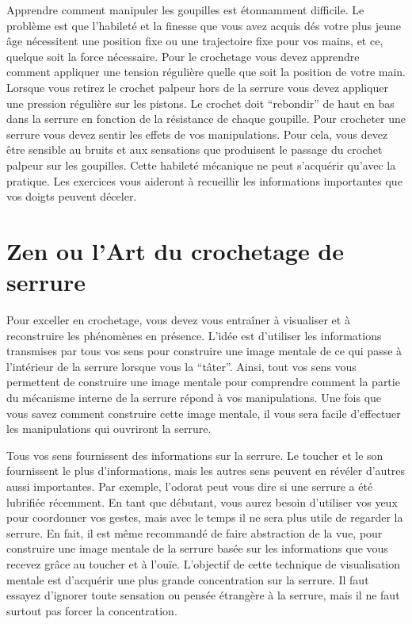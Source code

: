 \documentclass[a4paper,french,11pt,twoside]{report}
\begin{document}
Apprendre comment manipuler les goupilles est étonnamment difficile. Le problème est que l'habileté et la finesse que vous avez acquis dés votre plus jeune âge nécessitent une position fixe ou une trajectoire fixe pour vos mains, et ce, quelque soit la force nécessaire. Pour le crochetage vous devez apprendre comment appliquer une tension régulière quelle que soit la position de votre main. Lorsque vous retirez le crochet palpeur hors de la serrure vous devez appliquer une pression régulière sur les pistons. Le crochet doit \enquote{rebondir} de haut en bas dans la serrure en fonction de la résistance de chaque goupille.
Pour crocheter une serrure vous devez sentir les effets de vos manipulations. Pour cela, vous devez être sensible au bruits et aux sensations que produisent le passage du crochet palpeur sur les goupilles. Cette habileté mécanique ne peut s'acquérir qu'avec la pratique. Les exercices vous aideront à recueillir les informations importantes que vos doigts peuvent déceler.

\section{Zen ou l'Art du crochetage de serrure}

Pour exceller en crochetage, vous devez vous entraîner à visualiser et à reconstruire les phénomènes en présence. L'idée est d'utiliser les informations transmises par tous vos sens pour construire une image mentale de ce qui passe à l'intérieur de la serrure lorsque vous la \enquote{tâter}. Ainsi, tout vos sens vous permettent de construire une image mentale pour comprendre comment la partie du mécanisme interne de la serrure répond à vos manipulations. Une fois que vous savez comment construire cette image mentale, il vous sera facile d'effectuer les manipulations qui ouvriront la serrure.

Tous vos sens fournissent des informations sur la serrure. Le toucher et le son fournissent le plus d'informations, mais les autres sens peuvent en révéler d'autres aussi importantes. Par exemple, l'odorat peut vous dire si une serrure a été lubrifiée récemment. En tant que débutant, vous aurez besoin d'utiliser vos yeux pour coordonner vos gestes, mais avec le temps il ne sera plus utile de regarder la serrure. En fait, il est même recommandé de faire abstraction de la vue, pour construire une image mentale de la serrure basée sur les informations que vous recevez grâce au toucher et à l'ouïe. L'objectif de cette technique de visualisation mentale est d'acquérir une plus grande concentration sur la serrure. Il faut essayez d'ignorer toute sensation ou pensée étrangère à la serrure, mais il ne faut surtout pas forcer la concentration.
\end{document}
